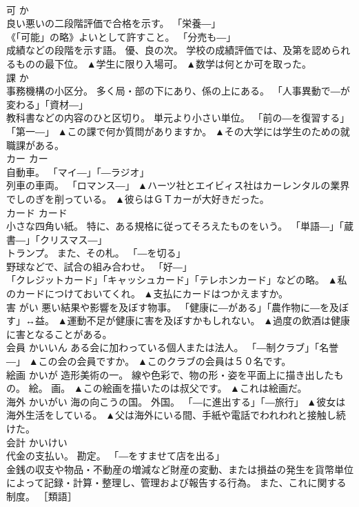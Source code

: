 \documentclass[8pt]{extreport}
\begin{document}
\begin{CJK}{UTF8}{min}
\\	可	か	
\\	良い悪いの二段階評価で合格を示す。 「栄養―」 
\\	《「可能」の略》よいとして許すこと。 「分売も―」 
\\	成績などの段階を示す語。 優、良の次。 学校の成績評価では、及第を認められるものの最下位。	▲学生に限り入場可。 ▲数学は何とか可を取った。
\\	課	か	
\\	事務機構の小区分。 多く局・部の下にあり、係の上にある。 「人事異動で―が変わる」「資材―」 
\\	教科書などの内容のひと区切り。 単元より小さい単位。 「前の―を復習する」「第一―」	▲この課で何か質問がありますか。 ▲その大学には学生のための就職課がある。
\\	カー	カー	
\\	自動車。 「マイ―」「―ラジオ」 
\\	列車の車両。 「ロマンス―」	▲ハーツ社とエイビィス社はカーレンタルの業界でしのぎを削っている。 ▲彼らはＧＴカーが大好きだった。
\\	カード	カード	
\\	小さな四角い紙。 特に、ある規格に従ってそろえたものをいう。 「単語―」「蔵書―」「クリスマス―」 
\\	トランプ。 また、その札。 「―を切る」 
\\	野球などで、試合の組み合わせ。 「好―」 
\\	「クレジットカード」「キャッシュカード」「テレホンカード」などの略。	▲私のカードにつけておいてくれ。 ▲支払にカードはつかえますか。
\\	害	がい	悪い結果や影響を及ぼす物事。 「健康に―がある」「農作物に―を及ぼす」↔益。	▲運動不足が健康に害を及ぼすかもしれない。 ▲過度の飲酒は健康に害となることがある。
\\	会員	かいいん	ある会に加わっている個人または法人。 「―制クラブ」「名誉―」	▲この会の会員ですか。 ▲このクラブの会員は５０名です。
\\	絵画	かいが	造形美術の一。 線や色彩で、物の形・姿を平面上に描き出したもの。 絵。 画。	▲この絵画を描いたのは叔父です。 ▲これは絵画だ。
\\	海外	かいがい	海の向こうの国。 外国。 「―に進出する」「―旅行」	▲彼女は海外生活をしている。 ▲父は海外にいる間、手紙や電話でわれわれと接触し続けた。
\\	会計	かいけい	
\\	代金の支払い。 勘定。 「―をすませて店を出る」 
\\	金銭の収支や物品・不動産の増減など財産の変動、または損益の発生を貨幣単位によって記録・計算・整理し、管理および報告する行為。 また、これに関する制度。 ［類語］

\end{CJK}
\end{document}
